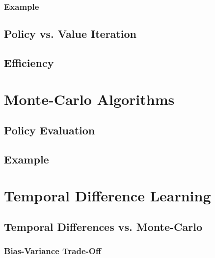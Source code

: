         \subsection{Example} %

    \section{Policy vs. Value Iteration} %

    \section{Efficiency} %

\chapter{Monte-Carlo Algorithms} %

    \section{Policy Evaluation} %

    \section{Example} %

\chapter{Temporal Difference Learning} %

    \section{Temporal Differences vs. Monte-Carlo} %

        \subsection{Bias-Variance Trade-Off} %

